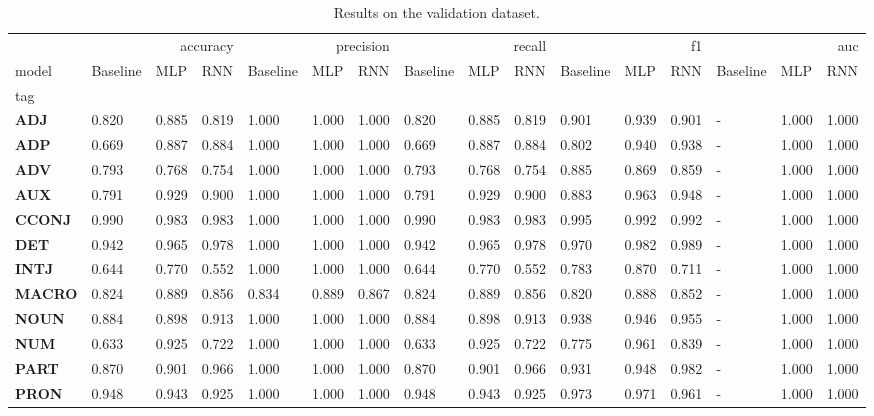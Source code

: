 \begin{table}
\caption{Results on the validation dataset.}
\label{tab::ex_2_valid}
\begin{tabular}{|l||l||l||l||l||l||l||l||l||l||l||l||l||l||l||l|}
\toprule
 & \multicolumn{3}{r}{accuracy} & \multicolumn{3}{r}{precision} & \multicolumn{3}{r}{recall} & \multicolumn{3}{r}{f1} & \multicolumn{3}{r}{auc} \\
model & Baseline & MLP & RNN & Baseline & MLP & RNN & Baseline & MLP & RNN & Baseline & MLP & RNN & Baseline & MLP & RNN \\
tag &  &  &  &  &  &  &  &  &  &  &  &  &  &  &  \\
\midrule
\textbf{ADJ} & 0.820 & 0.885 & 0.819 & 1.000 & 1.000 & 1.000 & 0.820 & 0.885 & 0.819 & 0.901 & 0.939 & 0.901 & - & 1.000 & 1.000 \\
\textbf{ADP} & 0.669 & 0.887 & 0.884 & 1.000 & 1.000 & 1.000 & 0.669 & 0.887 & 0.884 & 0.802 & 0.940 & 0.938 & - & 1.000 & 1.000 \\
\textbf{ADV} & 0.793 & 0.768 & 0.754 & 1.000 & 1.000 & 1.000 & 0.793 & 0.768 & 0.754 & 0.885 & 0.869 & 0.859 & - & 1.000 & 1.000 \\
\textbf{AUX} & 0.791 & 0.929 & 0.900 & 1.000 & 1.000 & 1.000 & 0.791 & 0.929 & 0.900 & 0.883 & 0.963 & 0.948 & - & 1.000 & 1.000 \\
\textbf{CCONJ} & 0.990 & 0.983 & 0.983 & 1.000 & 1.000 & 1.000 & 0.990 & 0.983 & 0.983 & 0.995 & 0.992 & 0.992 & - & 1.000 & 1.000 \\
\textbf{DET} & 0.942 & 0.965 & 0.978 & 1.000 & 1.000 & 1.000 & 0.942 & 0.965 & 0.978 & 0.970 & 0.982 & 0.989 & - & 1.000 & 1.000 \\
\textbf{INTJ} & 0.644 & 0.770 & 0.552 & 1.000 & 1.000 & 1.000 & 0.644 & 0.770 & 0.552 & 0.783 & 0.870 & 0.711 & - & 1.000 & 1.000 \\
\textbf{MACRO} & 0.824 & 0.889 & 0.856 & 0.834 & 0.889 & 0.867 & 0.824 & 0.889 & 0.856 & 0.820 & 0.888 & 0.852 & - & 1.000 & 1.000 \\
\textbf{NOUN} & 0.884 & 0.898 & 0.913 & 1.000 & 1.000 & 1.000 & 0.884 & 0.898 & 0.913 & 0.938 & 0.946 & 0.955 & - & 1.000 & 1.000 \\
\textbf{NUM} & 0.633 & 0.925 & 0.722 & 1.000 & 1.000 & 1.000 & 0.633 & 0.925 & 0.722 & 0.775 & 0.961 & 0.839 & - & 1.000 & 1.000 \\
\textbf{PART} & 0.870 & 0.901 & 0.966 & 1.000 & 1.000 & 1.000 & 0.870 & 0.901 & 0.966 & 0.931 & 0.948 & 0.982 & - & 1.000 & 1.000 \\
\textbf{PRON} & 0.948 & 0.943 & 0.925 & 1.000 & 1.000 & 1.000 & 0.948 & 0.943 & 0.925 & 0.973 & 0.971 & 0.961 & - & 1.000 & 1.000 \\

\end{tabular}
\end{table}
